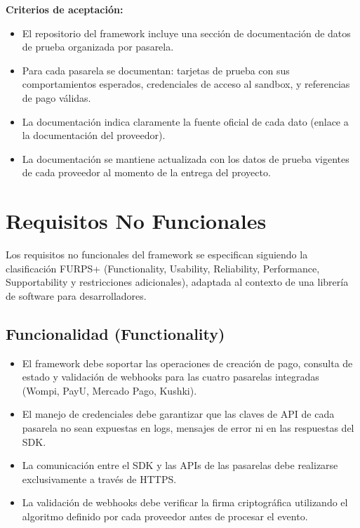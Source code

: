 \documentclass[10pt]{article}
\begin{document}
\textbf{Criterios de aceptación:}
\begin{itemize}
  \item El repositorio del framework incluye una sección de documentación de datos de prueba organizada por pasarela.
  \item Para cada pasarela se documentan: tarjetas de prueba con sus comportamientos esperados, credenciales de acceso al sandbox, y referencias de pago válidas.
  \item La documentación indica claramente la fuente oficial de cada dato (enlace a la documentación del proveedor).
  \item La documentación se mantiene actualizada con los datos de prueba vigentes de cada proveedor al momento de la entrega del proyecto.
\end{itemize}


\section{Requisitos No Funcionales}

Los requisitos no funcionales del framework se especifican siguiendo la clasificación FURPS+ (Functionality, Usability, Reliability, Performance, Supportability y restricciones adicionales), adaptada al contexto de una librería de software para desarrolladores.

\subsection{Funcionalidad (Functionality)}

\begin{itemize}
  \item El framework debe soportar las operaciones de creación de pago, consulta de estado y validación de webhooks para las cuatro pasarelas integradas (Wompi, PayU, Mercado Pago, Kushki).
  \item El manejo de credenciales debe garantizar que las claves de API de cada pasarela no sean expuestas en logs, mensajes de error ni en las respuestas del SDK.
  \item La comunicación entre el SDK y las APIs de las pasarelas debe realizarse exclusivamente a través de HTTPS.
  \item La validación de webhooks debe verificar la firma criptográfica utilizando el algoritmo definido por cada proveedor antes de procesar el evento.
\end{itemize}
\end{document}
